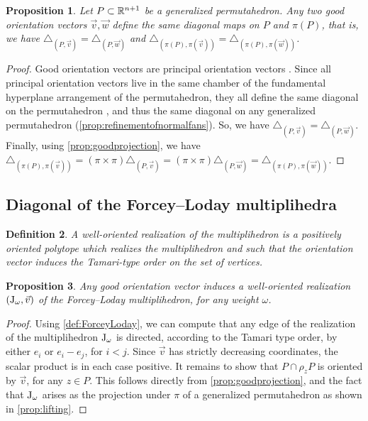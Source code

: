 \documentclass[twoside, 11pt]{amsart}
\newtheorem{definition}{Definition}[section]
\newtheorem{proposition}[definition]{Proposition}
\theoremstyle{remark}
\begin{document}
\begin{proposition}
Let $P\subset\mathbb{R}^{n+1}$ be a generalized permutahedron. 
Any two good orientation vectors $\vec v, \vec w$ define the same diagonal maps on $P$ and $\pi(P)$, that is, we have $\triangle_{(P,\vec v)}=\triangle_{(P,\vec w)}$ and $\triangle_{(\pi(P),\pi(\vec v))}=\triangle_{(\pi(P),\pi(\vec w))}$.
\end{proposition}
\begin{proof}
Good orientation vectors are principal orientation vectors \cite[Definition 3.15]{LA21}. Since all principal orientation vectors live in the same chamber of the fundamental hyperplane arrangement of the permutahedron, they all define the same diagonal on the permutahedron \cite[Proposition 1.21]{LA21}, and thus the same diagonal on any generalized permutahedron (\cref{prop:refinementofnormalfans}). So, we have $\triangle_{(P,\vec v)}=\triangle_{(P,\vec w)}$. Finally, using \cref{prop:goodprojection}, we have $\triangle_{(\pi(P),\pi(\vec v))}=(\pi \times \pi)\triangle_{(P,\vec v)}=(\pi \times \pi)\triangle_{(P,\vec w)}=\triangle_{(\pi(P),\pi(\vec w))}$. 
\end{proof}

\subsection{Diagonal of the Forcey--Loday multiplihedra}
\label{sec:diagonal}

\begin{definition}
A \emph{well-oriented realization of the multiplihedron} is a positively oriented polytope which realizes the multiplihedron and such that the orientation vector induces the Tamari-type order on the set of vertices. 
\end{definition}

\begin{proposition}
\label{prop:OrientationVector}
Any good orientation vector induces a well-oriented realization $\left( \mathrm{J}_\omega, \vec v \right)$ of the Forcey--Loday multiplihedron, for any weight $\omega$. 
\end{proposition}

\begin{proof}
Using \cref{def:ForceyLoday}, we can compute that any edge of the realization of the multiplihedron $\mathrm{J}_\omega$ is directed, according to the Tamari type order, by either $ e_i$ or $ e_i- e_j$, for $i<j$.
Since $\vec v$ has strictly decreasing coordinates, the scalar product is in each case positive. 
It remains to show that $P\cap\rho_z P$ is oriented by $\vec v$, for any $z \in P$. 
This follows directly from \cref{prop:goodprojection}, and the fact that $\mathrm{J}_\omega$ arises as the projection under $\pi$ of a generalized permutahedron as shown in  \cref{prop:lifting}.
\end{proof}
\end{document}
